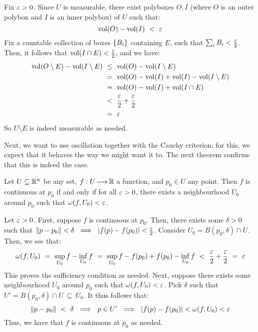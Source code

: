 \begin{pf}
    Fix $ \operatorname{\varepsilon} > 0 $. Since $ U $ is measurable, there exist polyboxes $ O, I $
    (where $ O $ is an outer polybox and $ I $ is an inner polybox) of $ U $
    such that:
    \begin{equation*}
        \vol(O) - \vol(I) \ < \ \ep
    \end{equation*}
    Fix a countable collection of boxes $ \left\{{B_{i}}\right\} $ containing $ E $, such
    that $ \sum_{i}B_{i} < \frac{\operatorname{\varepsilon}}{2} $. Then, it follows that
    $ \operatorname{vol}(I \cap E) < \frac{\operatorname{\varepsilon}}{2} $, and we have:
    \begin{align*}
        \operatorname{vol}(O \setminus E) - \operatorname{vol}(I \setminus E)
        & \ \leq \ \operatorname{vol}(O) - \operatorname{vol}(I \setminus E) \\
        & \ = \ \operatorname{vol}(O) - \operatorname{vol}(I) + \operatorname{vol}(I) - \operatorname{vol}(I \setminus E) \\
        & \ = \ \operatorname{vol}(O) - \operatorname{vol}(I) + \operatorname{vol}(I\cap E) \\
        & \ < \ \frac{\operatorname{\varepsilon}}{2} + \frac{\operatorname{\varepsilon}}{2} \\
        & \ = \ \operatorname{\varepsilon}
    \end{align*}
    So $ U \setminus E $ is indeed measurable as needed.
\end{pf}

Next, we want to use oscillation together with the Cauchy criterion; for this,
we expect that it behaves the way we might want it to. The next theorem confirms
that this is indeed the case.

\begin{thm}
    Let $ U \subseteq \mathbb{R}^{n} $ be any set, $ f: U \operatorname{\longrightarrow} \mathbb{R} $ a function, and
    $ p_{0} \in U $ any point. \vsp
    Then $ f $ is continuous at $ p_{0} $ if and only if for all $ \operatorname{\varepsilon} > 0 $,
    there exists a neighbourhood $ U_{0} $ around $ p_{0} $ such that
    $ \omega(f, U_{0}) < \operatorname{\varepsilon} $.
\end{thm}

\begin{pf}
    Let $ \operatorname{\varepsilon} > 0 $. First, suppose $ f $ is continuous at $ p_{0} $. Then,
    there exists some $ \delta > 0 $ such that $ \left\|p-p_{0}\right\| < \delta
    \ \implies \ \abs{f(p)-f(p_{0})} < \frac{\operatorname{\varepsilon}}{2} $. Consider $ U_{0} =
    B(p_{0}, \delta) \cap U $. Then, we see that:
    \begin{equation*}
        \omega(f,U_{0})\ = \ \sup_{U_{0}}f-\inf_{U_{0}}f\ = \
        \sup_{U_{0}}f-f(p_{0}) +f(p_{0})-\inf_{U_{0}}f \ < \
        \frac{\ep}{2}+\frac{\ep}{2}\ = \ \ep
    \end{equation*}
    This proves the sufficiency condition as needed. \vsp
    Next, suppose there exists some neighbourhood $ U_{0} $ around $ p_{0} $ such
    that $ \omega(f,U_{0}) < \operatorname{\varepsilon} $. Pick $ \delta $ such that $ U' = B(p_{0},
    \delta) \cap U \ \subseteq \ U_{0} $. It thus follows that:
    \begin{equation*}
        \left\|p-p_{0}\right\| \ < \ \delta \ \implies \
        p \in U' \ \implies \ \abs{f(p)-f(p_{0})} < \omega(f,U_{0}) < \operatorname{\varepsilon}
    \end{equation*}
    Thus, we have that $ f $ is continuous at $ p_{0} $ as needed.
\end{pf}

